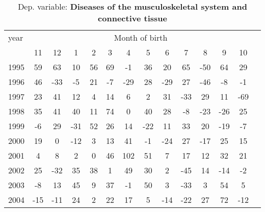  \begin{table}[H] \begin{threeparttable} \centering \caption{Dep. variable: \textbf{Diseases of the musculoskeletal system and connective tissue}} {\def\sym#1{\ifmmode^{#1}\else\(^{#1}\)\fi} \begin{tabular}{l*{13}{c}} \toprule year & \multicolumn{12}{c}{Month of birth} \\ \cmidrule(lr){2-13} 
            &          11&          12&           1&           2&           3&           4&           5&           6&           7&           8&           9&          10\\
1995        &          59&          63&          10&          56&          69&          -1&          36&          20&          65&         -50&          64&          29\\
1996        &          46&         -33&          -5&          21&          -7&         -29&          28&         -29&          27&         -46&          -8&          -1\\
1997        &          23&          41&          12&           4&          14&           6&           2&          31&         -33&          29&          11&         -69\\
1998        &          35&          41&          40&          11&          74&           0&          40&          28&          -8&         -23&         -26&          25\\
1999        &          -6&          29&         -31&          52&          26&          14&         -22&          11&          33&          20&         -19&          -7\\
2000        &          19&           0&         -12&           3&          13&          41&          -1&         -24&          27&         -17&          25&          15\\
2001        &           4&           8&           2&           0&          46&         102&          51&           7&          17&          12&          32&          21\\
2002        &          25&         -32&          35&          38&           1&          49&          30&           2&         -45&          14&         -14&          -2\\
2003        &          -8&          13&          45&           9&          37&          -1&          50&           3&         -33&           3&          54&           5\\
2004        &         -15&         -11&          24&           2&          22&          17&           5&         -14&         -22&          27&          72&         -12\\

\end{tabular}}
\end{threeparttable}
\end{table}
